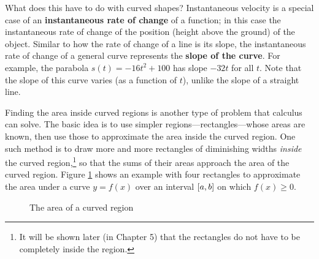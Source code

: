 What does this have to do with curved shapes? Instantaneous velocity is a
special case of an \textbf{instantaneous rate of change} of a function; in this case the instantaneous rate of change of
the position (height above the ground) of the object. Similar to how the rate
of change of a line is its slope, the instantaneous rate of change of a general
curve represents the \textbf{slope of the curve}. For example, the parabola
$s(t) = -16t^2 + 100$ has slope $-32t$ for all $t$. Note that the slope of this
curve varies (as a function of $t$), unlike the slope of a straight line.

Finding the area inside curved regions is another type of problem that calculus
can solve. The basic idea is to use simpler regions---rectangles---whose areas
are known, then use those to approximate the area inside the curved
region. One such method is to draw more and more rectangles of diminishing
widths \emph{inside} the curved region,\footnote{It will be
shown later (in Chapter 5) that the rectangles do not have to be completely
inside the region.} so that the sums of their areas approach the area of the
curved region. Figure \ref{fig:area} shows an example with four
rectangles to approximate the area under a curve $y=f(x)$ over an interval
$\lbrack a,b \rbrack$ on which $f(x) \ge 0$.

\begin{figure}[ht]
 \begin{center}
  \vspace{-6mm}
 \end{center}
 \caption[]{\quad The area of a curved region}
 \label{fig:area}
\end{figure}

